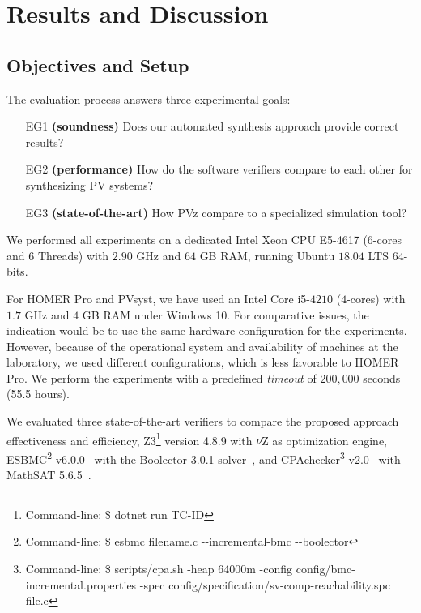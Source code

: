 \documentclass[journal]{IEEEtran}
\begin{document}
\section{Results and Discussion}

\subsection{Objectives and Setup}
\label{ObjectivesAndSetup}

The evaluation process answers three experimental goals:

\begin{tcolorbox}
\begin{enumerate}
\item [EG1] \textbf{(soundness)} Does our automated synthesis approach provide correct results?
\item [EG2] \textbf{(performance)} How do the software verifiers compare to each other for synthesizing PV systems?
\item [EG3] \textbf{(state-of-the-art)} How PVz compare to a specialized simulation tool?
\end{enumerate}
\end{tcolorbox}

We performed all experiments on a dedicated Intel Xeon CPU E5-4617 ($6$-cores and 6 Threads) with $2.90$ GHz and $64$ GB RAM, running Ubuntu $18.04$ LTS $64$-bits.

For HOMER Pro and PVsyst, we have used an Intel Core i5-$4210$ ($4$-cores) with $1.7$ GHz and $4$ GB RAM under Windows 10. For comparative issues, the indication would be to use the same hardware configuration for the experiments. However, because of the operational system and availability of machines at the laboratory, we used different configurations, which is less favorable to HOMER Pro. We perform the experiments with a predefined \textit{timeout} of $200,000$ seconds (55.5 hours).

We evaluated three state-of-the-art verifiers to compare the proposed approach effectiveness and efficiency, Z3\footnote{Command-line: \$ dotnet run TC-ID} version 4.8.9 with $\nu$Z as optimization engine, ESBMC\footnote{Command-line: \$ esbmc filename.c -\phantom{}-incremental-bmc -\phantom{}-boolector} v6.0.0~\cite{esbmc2018} with the Boolector 3.0.1 solver~\cite{Brummayer}, and CPAchecker\footnote{Command-line: \$ scripts/cpa.sh -heap 64000m -config config/bmc-incremental.properties -spec config/specification/sv-comp-reachability.spc file.c} v2.0~\cite{Beyer2011} with MathSAT 5.6.5~\cite{mathsat5}.
\end{document}
